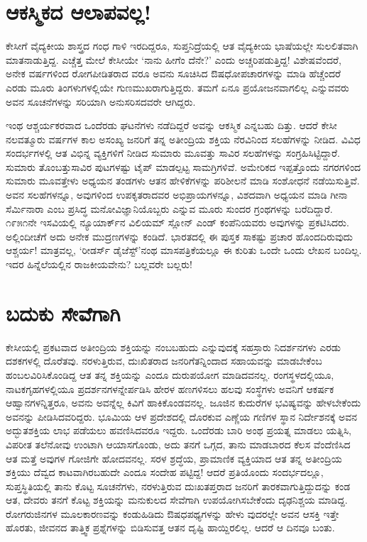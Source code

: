 \section*{ಆಕಸ್ಮಿಕದ ಆಲಾಪವಲ್ಲ!}


ಕೇಸೀಗೆ ವೈದ್ಯಕೀಯ ಶಾಸ್ತ್ರದ ಗಂಧ ಗಾಳಿ ಇರದಿದ್ದರೂ, ಸುಪ್ತನಿದ್ರೆಯಲ್ಲಿ ಆತ ವೈದ್ಯಕೀಯ ಭಾಷೆಯಲ್ಲೇ ಸುಲಲಿತವಾಗಿ ಮಾತನಾಡುತ್ತಿದ್ದ. ಎಚ್ಚೆತ್ತ ಮೇಲೆ ಕೇಸೀಯೇ ‘ನಾನು ಹೀಗೆಂ ದೆನೇ?’ ಎಂದು ಅಚ್ಚರಿಪಡುತ್ತಿದ್ದ! ವಿಶೇಷವೆಂದರೆ, ಅನೇಕ ವರ್ಷಗಳಿಂದ ರೋಗಪೀಡಿತರಾದ ವರೂ ಅವನು ಸೂಚಿಸಿದ ಔಷಧೋಪಚಾರಗಳನ್ನು ಮಾಡಿ ಹೆಚ್ಚೆಂದರೆ ಎರಡು ಮೂರು ತಿಂಗಳುಗಳಲ್ಲಿಯೇ ಗುಣಮುಖರಾಗುತ್ತಿದ್ದರು. ತಮಗೆ ಏನೂ ಪ್ರಯೋಜನವಾಗಲಿಲ್ಲ ಎನ್ನುವವರು ಅವನ ಸೂಚನೆಗಳನ್ನು ಸರಿಯಾಗಿ ಅನುಸರಿಸದವರೇ ಆಗಿದ್ದರು.

ಇಂಥ ಆಶ್ಚರ್ಯಕರವಾದ ಒಂದೆರಡು ಘಟನೆಗಳು ನಡೆದಿದ್ದರೆ ಅವನ್ನು ಆಕಸ್ಮಿಕ ಎನ್ನಬಹು ದಿತ್ತು. ಆದರೆ ಕೇಸೀ ನಲವತ್ಮೂರು ವರ್ಷಗಳ ಕಾಲ ಅಸಂಖ್ಯ ಜನರಿಗೆ ತನ್ನ ಅತೀಂದ್ರಿಯ ಶಕ್ತಿಯ ನೆರವಿನಿಂದ ಸಲಹೆಗಳನ್ನು ನೀಡಿದ. ವಿವಿಧ ಸಂದರ್ಭಗಳಲ್ಲಿ ಆತ ವಿಭಿನ್ನ ವ್ಯಕ್ತಿಗಳಿಗೆ ನೀಡಿದ ಸುಮಾರು ಮೂವತ್ತು ಸಾವಿರ ಸಲಹೆಗಳನ್ನು ಸಂಗ್ರಹಿಸಿಟ್ಟಿದ್ದಾರೆ. ಸುಮಾರು ತೊಂಬತ್ತುಸಾವಿರ ಪುಟಗಳಷ್ಟು ಟೈಪ್ ಮಾಡಲ್ಪಟ್ಟ ಸಾಮಗ್ರಿಗಳಿವೆ. ಅಮೇರಿಕದ ಇಪ್ಪತ್ತೊಂದು ನಗರಗಳಿಂದ ಸುಮಾರು ಮೂವತ್ತೇಳು ಅಧ್ಯಯನ ತಂಡಗಳು ಆತನ ಹೇಳಿಕೆಗಳನ್ನು ಪರಿಶೀಲನೆ ಮಾಡಿ ಸಂಶೋಧನೆ ನಡೆಯಿಸುತ್ತಿವೆ. ಅವನ ಸಲಹೆಗಳನ್ನೂ, ಅವುಗಳಿಂದ ಉಪಕೃತರಾದವರ ಅಭಿಪ್ರಾಯಗಳನ್ನೂ, ವಿಶದವಾಗಿ ಅಧ್ಯಯನ ಮಾಡಿ ಗೀನಾ ಸೆರ್ಮಿನಾರಾ ಎಂಬ ಪ್ರಸಿದ್ಧ ಮನೋವಿಜ್ಞಾನಿಯೊಬ್ಬರು  ಎನ್ನುವ ಮೂರು ಸುಂದರ ಗ್ರಂಥಗಳನ್ನು ಬರೆದಿದ್ದಾರೆ. ೧೯೫೧ನೇ ಇಸವಿಯಲ್ಲಿ ನ್ಯೂಯಾರ್ಕ್​ನ ವಿಲಿಯಮ್ ಸ್ಲೋನ್ ಎಂಡ್ ಕಂಪೆನಿಯವರು ಅವುಗಳನ್ನು ಪ್ರಕಟಿಸಿದರು. ಅಲ್ಲಿಂದೀಚೆಗೆ ಅದು ಅನೇಕ ಮುದ್ರಣಗಳನ್ನು ಕಂಡಿದೆ. ಭಾರತದಲ್ಲಿ ಈ ಪುಸ್ತಕ ಸಾಕಷ್ಟು ಪ್ರಚಾರ ಹೊಂದದಿರುವುದು ಆಶ್ಚರ್ಯ! ಮಾತ್ರವಲ್ಲ, ‘ರೀಡರ್ಸ್ ಡೈಜೆಸ್ಟ್​’ನಂಥ ಮಾಸಪತ್ರಿಕೆಯಲ್ಲೂ ಈ ಕುರಿತು ಒಂದೇ ಒಂದು ಲೇಖನ ಬಂದಿಲ್ಲ. ಇದರ ಹಿನ್ನೆಲೆಯಲ್ಲಿನ ರಾಜಕೀಯವೇನು? ಬಲ್ಲವರೇ ಬಲ್ಲರು!


\section*{ಬದುಕು ಸೇವೆಗಾಗಿ}


ಕೇಸೀಯಲ್ಲಿ ಪ್ರಕಟವಾದ ಅತೀಂದ್ರಿಯ ಶಕ್ತಿಯನ್ನು ನಂಬಬಹುದು ಎನ್ನುವುದಕ್ಕೆ ಸಹಸ್ರಾರು ನಿದರ್ಶನಗಳು ಎರಡು ದಶಕಗಳಲ್ಲಿ ದೊರೆತವು. ನರಳುತ್ತಿರುವ, ದುಃಖಿತರಾದ ಜನರಿಗೆ\break ತನ್ನಿಂದಾದ ಸಹಾಯವನ್ನು ಮಾಡಬೇಕೆಂಬ ಹಂಬಲವಿರಿಸಿಕೊಂಡಿದ್ದ ಆತ ತನ್ನ ಶಕ್ತಿಯನ್ನು ಎಂದೂ ದುರುಪಯೋಗ ಮಾಡಿದವನಲ್ಲ. ರಂಗಸ್ಥಳದಲ್ಲಿಯೂ, ನಾಟಕಗೃಹಗಳಲ್ಲಿಯೂ ಪ್ರದರ್ಶನ\-ಗಳನ್ನೇರ್ಪಡಿಸಿ ಹೇರಳ ಹಣಗಳಿಸಲು ಹಲವು ಸಂಸ್ಥೆಗಳು ಅವನಿಗೆ ಆಕರ್ಷಕ ಆಹ್ವಾನಗಳನ್ನಿತ್ತರೂ, ಅವನು ಅವನ್ನೆಲ್ಲ ಕಿವಿಗೆ ಹಾಕಿಕೊಂಡವನಲ್ಲ. ಜೂಜಿನ ಕುದುರೆಗಳ ಭವಿಷ್ಯವನ್ನು ಹೇಳಬೇಕೆಂದು ಅವನನ್ನು ಪೀಡಿಸಿದವರಿದ್ದರು. ಭೂಮಿಯ ಆಳ ಪ್ರದೇಶದಲ್ಲಿ ದೊರಕುವ ಎಣ್ಣೆಯ ಗಣಿಗಳ ಸ್ಥಾನ ನಿರ್ದೇಶನಕ್ಕೆ ಅವನ ಅದ್ಭುತಶಕ್ತಿಯ ಲಾಭ ಪಡೆಯಲು ಹವಣಿಸಿದವರೂ ಇದ್ದರು. ಒಂದೆರಡು ಬಾರಿ ಅಂಥ ಪ್ರಯತ್ನ ಮಾಡಲು ಯತ್ನಿಸಿ, ವಿಪರೀತ ತಲೆನೋವು ಉಂಟಾಗಿ ಆಯಾಸಗೊಂಡು, ಅದು ತನಗೆ ಒಗ್ಗದ, ತಾನು ಮಾಡಬಾರದ ಕೆಲಸ ವೆಂದೆಣಿಸಿದ ಆತ ಮತ್ತೆ ಅವುಗಳ ಗೋಜಿಗೇ ಹೋದವನಲ್ಲ. ಸರಳ ಶ್ರದ್ಧೆಯ, ಪ್ರಾಮಾಣಿಕ ವ್ಯಕ್ತಿಯಾದ ಆತ ತನ್ನ ಅತೀಂದ್ರಿಯ ಶಕ್ತಿಯು ದೆವ್ವದ ಕಾಟವಾಗಿರಬಹುದೇ ಎಂದೂ ಸಂದೇಹ ಪಟ್ಟಿದ್ದ! ಆದರೆ ಪ್ರತಿಯೊಂದು ಸಂದರ್ಭದಲ್ಲೂ, ಸುಪ್ತಸ್ಥಿತಿಯಲ್ಲಿ ತಾನು ಕೊಟ್ಟ ಸೂಚನೆಗಳು, ನರಳುತ್ತಿರುವ ದುಃಖತಪ್ತರಾದ ಜನರಿಗೆ ತಾರಕವಾಗುತ್ತಿದ್ದುದನ್ನು ಕಂಡ ಆತ, ದೇವರು ತನಗೆ ಕೊಟ್ಟ ಶಕ್ತಿಯನ್ನು ಮನುಕುಲದ ಸೇವೆಗಾಗಿ ಉಪಯೋಗಿಸಬೇಕೆಂದು ದೃಢನಿಶ್ಚಯ ಮಾಡಿದ್ದ. ರೋಗರುಜಿನಗಳ ಮೂಲಕಾರಣವನ್ನು ಕಂಡುಹಿಡಿದು ಔಷಧಪಥ್ಯಗಳನ್ನು ಹೇಳು ವುದರಲ್ಲೇ ಅವನ ಆಸಕ್ತಿ ಇತ್ತೇ ಹೊರತು, ಜೀವನದ ತಾತ್ತ್ವಿಕ ಪ್ರಶ್ನೆಗಳನ್ನು ಬಿಡಿಸುವತ್ತ ಆತನ ದೃಷ್ಟಿ ಹಾಯ್ದಿರಲಿಲ್ಲ. ಆದರೆ ಆ ದಿನವೂ ಬಂತು.


